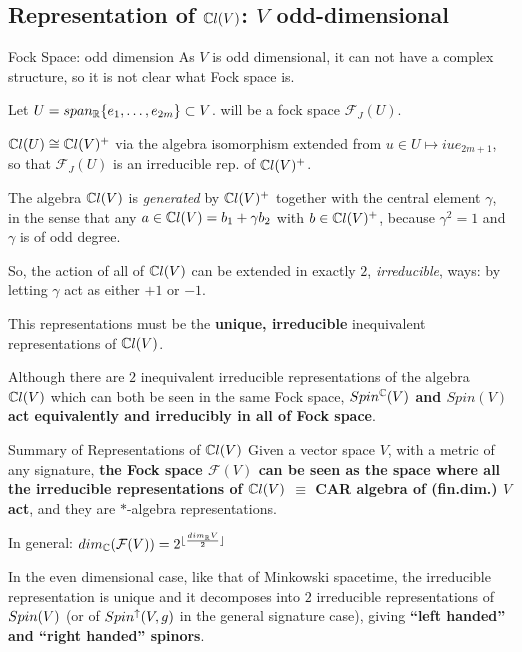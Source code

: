 \subsection{Representation of $\mathbb C l(V)$: $V$ odd-dimensional}

\begin{frame}{Fock Space: odd dimension} %
    As $V$ is odd dimensional, it can not have a complex structure, so it is not clear what Fock space is.
    
    Let $U = span_\mathbb R\{e_1, \dots, e_{2m}\} \subset V$.  will be a fock space $\mathcal F_J(U)$.
    
    $\mathbb C l(U) \cong \mathbb C l(V)^+$ via the algebra isomorphism extended from $u \in U \mapsto iue_{2m+1}$, so that $\mathcal F_J(U)$ is an irreducible rep. of $\mathbb C l(V)^+$.
    
    The algebra $\mathbb C l(V)$ is \emph{generated} by $\mathbb C l(V)^+$ together with the central element $\gamma$, in the sense that any $a \in \mathbb C l(V) = b_1 + \gamma b_2$ with $b \in \mathbb C l(V)^+$, because $\gamma^2 = 1$ and $\gamma$ is of odd degree.
    

\end{frame}

\begin{frame} %
    So, the action of all of $\mathbb C l(V)$ can be extended in exactly $2$, \emph{irreducible}, ways: by letting $\gamma$ act as either $+1$ or $-1$. 
    
    This representations must be the \textbf{unique, irreducible} inequivalent representations of $\mathbb C l(V)$.    
    
    Although there are $2$ inequivalent irreducible representations of the algebra $\mathbb C l(V)$ which can both be seen in the same Fock space, \textbf{$Spin^\mathbb C(V)$ and $Spin(V)$ act equivalently and irreducibly in all of Fock space}.
    
\end{frame}

\begin{frame}{Summary of Representations of $\mathbb C l(V)$} %
    Given a vector space $V$, with a metric of any signature, \textbf{the Fock space $\mathcal F(V)$ can be seen as the space where all the irreducible representations of $\mathbb C l(V)$ $\equiv$ CAR algebra of (fin.dim.) $V$  act}, and they are $*$-algebra representations.

    In general: $dim_\mathbb C (\mathcal F(V)) = 2^{\lfloor\frac{dim_\mathbb R V}{2} \rfloor}$
    
    In the even dimensional case, like that of Minkowski spacetime, the irreducible representation is unique and it decomposes into $2$ irreducible representations of $Spin(V)$ (or of $Spin^\uparrow(V, g)$ in the general signature case), giving \textbf{``left handed'' and ``right handed'' spinors}. %
\end{frame}